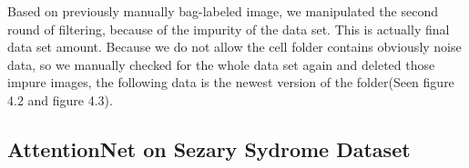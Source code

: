 Based on previously manually bag-labeled image, we manipulated the second round of filtering, because of the impurity of the data set. This is actually final data set amount. Because we do not allow the cell folder contains obviously noise data, so we manually checked for the whole data set again and deleted those impure images, the following data is the newest version of the folder(Seen figure 4.2 and figure 4.3). 



\subsection{AttentionNet on Sezary Sydrome Dataset}

\begin{table}[t]
\end{table}
